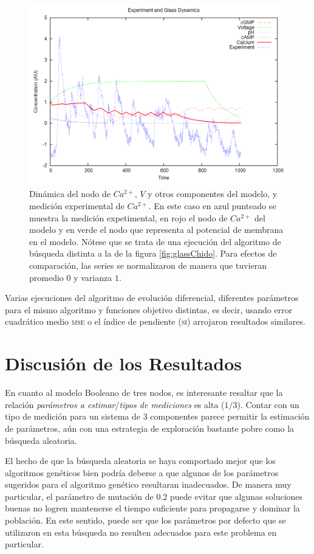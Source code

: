 \begin{figure}[h]
\includegraphics[width=0.9\linewidth]{gfx/glassChafa}
\caption[Dinámica de $Ca^{2+}$, $V$ y otros componentes del modelo, y medición experimental de $Ca^{2+}$]{Dinámica del nodo de $Ca^{2+}$, $V$ y otros componentes del modelo, y medición experimental de $Ca^{2+}$. En este caso en azul punteado se muestra la medición expetimental, en rojo el nodo de $Ca^{2+}$ del modelo y en verde el nodo que representa al potencial de membrana en el modelo. Nótese que se trata de una ejecución del algoritmo de búsqueda distinta a la de la figura \ref{fig:glassChido}. Para efectos de comparación, las series se normalizaron de manera que tuvieran promedio $0$ y varianza $1$.}\label{fig:glassChafa}
\end{figure}

Varias ejecuciones del algoritmo de evolución diferencial, diferentes parámetros para el mismo algoritmo y funciones objetivo distintas, es decir, usando error cuadrático medio \textsc{mse} o el índice de pendiente \textsc{(si)} arrojaron resultados similares.


\section{Discusión de los Resultados}

En cuanto al modelo Booleano de tres nodos, es interesante resaltar que la relación \emph{parámetros a estimar}/\emph{tipos de mediciones} es alta ($1/3$). Contar con un tipo de medición para un sistema de 3 componentes parece permitir la estimación de parámetros, aún con una estrategia de exploración bastante pobre como la búsqueda aleatoria.

El hecho de que la búsqueda aleatoria se haya comportado mejor que los algoritmos genéticos bien podría deberse a que algunos de los parámetros sugeridos para el algoritmo genético resultaran inadecuados. De manera muy particular, el parámetro de mutación de $0.2$ puede evitar que algunas soluciones buenas no logren mantenerse el tiempo suficiente para propagarse y dominar la población. En este sentido, puede ser que los parámetros por defecto que se utilizaron en esta búsqueda no resulten adecuados para este problema en particular.


